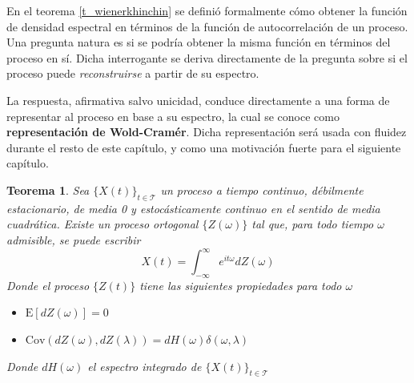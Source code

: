 \documentclass[12pt,letterpaper]{book}
\newtheorem{teorema}{Teorema}[chapter]
\newcommand{\intR}{\int_{-\infty}^{\infty}}
\newcommand{\E}[1]{\mathrm{E}\left[ #1 \right]}
\newcommand{\Cov}[1]{\mathrm{Cov}\left( #1 \right)}
\newcommand{\abso}[1]{\left| #1 \right|}
\newcommand{\xt}{$\{X(t)\}_{t\in \mathcal{T}}$ }
\begin{document}
En el teorema \ref{t_wienerkhinchin} se definió formalmente cómo obtener la función de densidad espectral en términos de la función de autocorrelación de un proceso.
%
Una pregunta natura es si se podría obtener la misma función en términos del proceso en sí.
%
Dicha interrogante se deriva directamente de la pregunta sobre si el proceso puede \textit{reconstruirse} a partir de su espectro.

La respuesta, afirmativa salvo unicidad, conduce directamente a una forma de representar al proceso en base a su espectro, la cual se conoce como \textbf{representación de Wold-Cramér}.
%
Dicha representación será usada con fluidez durante el resto de este capítulo, y como una motivación fuerte para el siguiente capítulo.

\begin{teorema}
Sea \xt un proceso a tiempo continuo, débilmente estacionario, de media 0 y estocásticamente continuo en el sentido de media cuadrática. Existe un proceso ortogonal $\{Z(\omega)\}$ tal que, para todo tiempo $\omega$ admisible, se puede escribir
\begin{equation*}
X(t) = \intR e^{i t \omega} dZ(\omega)
\end{equation*}
Donde el proceso $\{Z(t)\}$ tiene las siguientes propiedades para todo $\omega$
\begin{itemize}
\item $\E{dZ(\omega)} = 0$
\item $\Cov{dZ(\omega),dZ(\lambda)} = dH(\omega) \delta(\omega, \lambda)$
\end{itemize}
Donde $dH(\omega)$ el espectro integrado de \xt
\label{rep_espectral}
\end{teorema}
\end{document}
